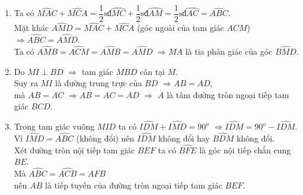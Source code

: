 \begin{bt}
{\begin{center}
	\end{center}
	
\begin{enumerate}
	\item Ta có $\widehat{MAC}+\widehat{MCA}=\dfrac{1}{2}\text{sđ}\wideparen{MC}+\dfrac{1}{2}\text{sđ}\wideparen{AM}=\dfrac{1}{2}\text{sđ}\wideparen{AC}=\widehat{ABC}$.\\
	Mặt khác $\widehat{AMD}=\widehat{MAC}+\widehat{MCA}$ (góc ngoài của tam giác $ACM$)
	$\Rightarrow \widehat{ABC}=\widehat{AMD}$.\\
	Ta có $\widehat{AMB}=\widehat{ACM}=\widehat{AMB}=\widehat{AMD}$ $\Rightarrow $$MA$ là tia phân giác của góc $\widehat{BMD}$.
	\item  Do $MI\perp BD$ $\Rightarrow $ tam giác $MBD$ cân tại $M$.\\
	Suy ra $MI$ là đường trung trực của $BD$ $\Rightarrow AB=AD$,\\
	mà $AB=AC$ $\Rightarrow AB=AC=AD$ $\Rightarrow $ $A$ là tâm đường tròn ngoại tiếp tam giác $BCD$.
	\item Trong tam giác vuông $MID$ ta có $\widehat{IDM}+\widehat{IMD}={{90}^{o}}$ $\Rightarrow \widehat{IDM}={{90}^{o}}-\widehat{IDM}$. \\
	Vì $\widehat{IMD}=\widehat{ABC}$ (không đổi) nên $\widehat{IDM}$ không đổi hay $\widehat{BDM}$ không đổi.\\
	Xét đường tròn nội tiếp tam giác $BEF$ ta có $\widehat{BFE}$ là góc nội tiếp chắn cung $BE$.\\
	Mà $\widehat{ABC}=\widehat{ACB}=\widehat{AFB}$ \\
	nên $AB$ là tiếp tuyến của đường tròn ngoại tiếp tam giác $BEF$.
\end{enumerate}


}
	
\end{bt}

